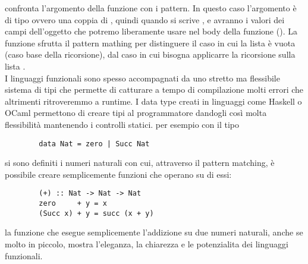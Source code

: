      confronta l'argomento della funzione con i pattern. In questo caso l'argomento è di tipo  ovvero
    una coppia di , quindi quando si scrive ,  e  avranno i valori dei campi dell'oggetto 
    che potremo liberamente usare nel body della funzione ().
    La funzione  sfrutta il pattern mathing per distinguere il caso in cui la lista è vuota  (caso base della ricorsione), dal caso in cui
    bisogna applicarre la ricorsione sulla lista . 
    \\I linguaggi funzionali sono spesso accompagnati da uno stretto ma flessibile sistema di tipi
    che permette di catturare a tempo di compilazione molti errori che altrimenti ritroveremmo a runtime. I data type creati in linguaggi come Haskell o OCaml
    permettono di creare tipi al programmatore dandogli così molta flessibilità mantenendo i controlli statici. per esempio con il tipo 
    \begin{verbatim}
        data Nat = zero | Succ Nat
    \end{verbatim}
    si sono definiti i numeri naturali con cui, attraverso il pattern matching, è possibile creare semplicemente funzioni che operano su di essi:
    \begin{verbatim}
        (+) :: Nat -> Nat -> Nat
        zero     + y = x
        (Succ x) + y = succ (x + y) 
    \end{verbatim}
    la funzione \code{(+)} che esegue semplicemente l'addizione su due numeri naturali, anche se molto in piccolo, mostra l'eleganza, la chiarezza e le potenzialita dei linguaggi funzionali.